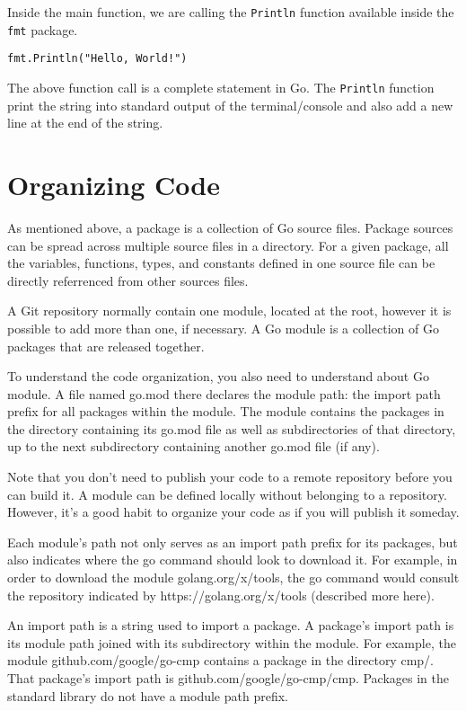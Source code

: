 Inside the main function, we are calling the \texttt{Println} function available
inside the \texttt{fmt} package.

\begin{lstlisting}[numbers=none]
fmt.Println("Hello, World!")
\end{lstlisting}

The above function call is a complete statement in Go.
The \texttt{Println} function print the string into standard output of
the terminal/console and also add a new line at the end of the string.

\section{Organizing Code}

As mentioned above, a package is a collection of Go source files. Package
sources can be spread across multiple source files in a directory. For a given
package, all the variables, functions, types, and constants defined in one
source file can be directly referrenced from other sources files.

A Git repository normally contain one module, located at the root, however it is
possible to add more than one, if necessary. A Go module is a collection of Go
packages that are released together.

To understand the code organization, you also need to understand about Go
module. A file named go.mod there declares the module path: the import path
prefix for all packages within the module. The module contains the packages in
the directory containing its go.mod file as well as subdirectories of that
directory, up to the next subdirectory containing another go.mod file (if any).

Note that you don't need to publish your code to a remote repository before you
can build it. A module can be defined locally without belonging to a repository.
However, it's a good habit to organize your code as if you will publish it
someday.

Each module's path not only serves as an import path prefix for its packages,
but also indicates where the go command should look to download it. For example,
in order to download the module golang.org/x/tools, the go command would consult
the repository indicated by https://golang.org/x/tools (described more here).

An import path is a string used to import a package. A package's import path is
its module path joined with its subdirectory within the module. For example, the
module github.com/google/go-cmp contains a package in the directory cmp/. That
package's import path is github.com/google/go-cmp/cmp. Packages in the standard
library do not have a module path prefix.

